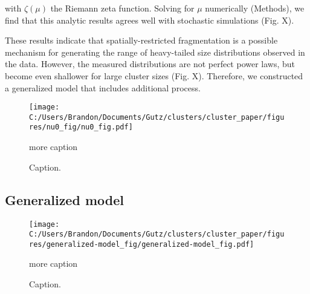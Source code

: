 \documentclass[aps,pre,twocolumn]{revtex4-1}
\begin{document}
\noindent with $\zeta(\mu)$ the Riemann zeta function. Solving for $\mu$ numerically (Methods), we find that this analytic results agrees well with stochastic simulations (Fig. X).

These results indicate that spatially-restricted fragmentation is a possible mechanism for generating the range of heavy-tailed size distributions observed in the data. However, the measured distributions are not perfect power laws, but become even shallower for large cluster sizes (Fig. X). Therefore, we constructed a generalized model that includes additional process. 
 
 \begin{figure}%
	\centerline{
		\texttt{[image: C:/Users/Brandon/Documents/Gutz/clusters/cluster\_paper/figures/nu0\_fig/nu0\_fig.pdf]}}
	\caption{Caption.}{more caption}
	\label{fig:nu0-fig}
\end{figure}


\subsection{Generalized model}

\begin{figure*}%
	\centerline{
		\texttt{[image: C:/Users/Brandon/Documents/Gutz/clusters/cluster\_paper/figures/generalized-model\_fig/generalized-model\_fig.pdf]}}
	\caption{Caption.}{more caption}
	\label{fig:generalized-fig}
\end{figure*}

\end{document}
